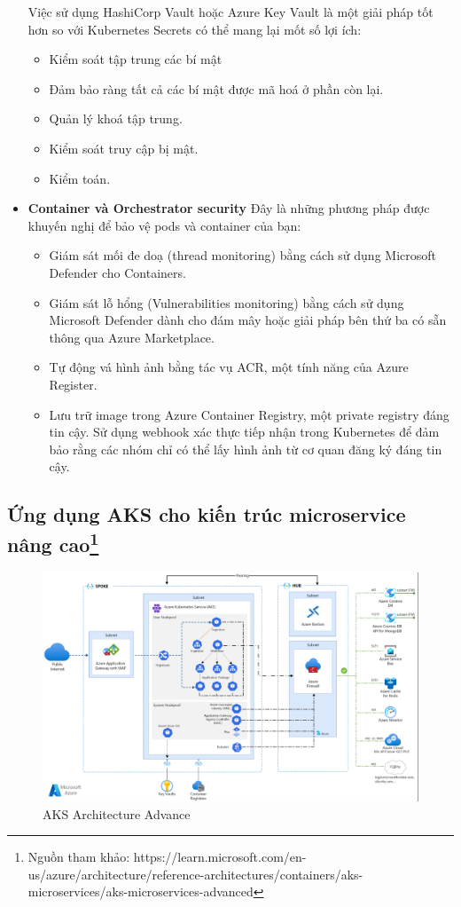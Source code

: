 \begin{itemize}
\begin{itemize}
        \end{itemize}
    Việc sử dụng HashiCorp Vault hoặc Azure Key Vault là một giải pháp tốt hơn so với Kubernetes Secrets có thể mang lại mốt số lợi ích:
        \begin{itemize}
            \item Kiểm soát tập trung các bí mật
            \item Đảm bảo ràng tất cả các bí mật được mã hoá ở phần còn lại.
            \item Quản lý khoá tập trung.
            \item Kiểm soát truy cập bị mật.
            \item Kiểm toán.
        \end{itemize}
    \item \textbf{Container và Orchestrator security}
    Đây là những phương pháp được khuyến nghị để bảo vệ pods và container của bạn:
        \begin{itemize}
            \item Giám sát mối đe doạ (thread monitoring) bằng cách sử dụng Microsoft Defender cho Containers.
            \item Giám sát lỗ hổng (Vulnerabilities monitoring) bằng cách sử dụng Microsoft Defender dành cho đám mây hoặc giải pháp bên thứ ba có sẵn thông qua Azure Marketplace.
            \item Tự động vá hình ảnh bằng tác vụ ACR, một tính năng của Azure Register. 
            \item Lưu trữ image trong Azure Container Registry, một private registry đáng tin cậy. Sử dụng webhook xác thực tiếp nhận trong Kubernetes để đảm bảo rằng các nhóm chỉ có thể lấy hình ảnh từ cơ quan đăng ký đáng tin cậy.
        \end{itemize}
      
\end{itemize}
\newpage
\subsection {Ứng dụng AKS cho kiến trúc microservice nâng cao\protect\footnote{Nguồn tham khảo: https://learn.microsoft.com/en-us/azure/architecture/reference-architectures/containers/aks-microservices/aks-microservices-advanced}}
\begin{figure}[H]
    \centering
    \includegraphics[scale=0.6]{images/hieu/chap-2/aks-architecture-advance.png}
    \caption{AKS Architecture Advance}
\end{figure}

